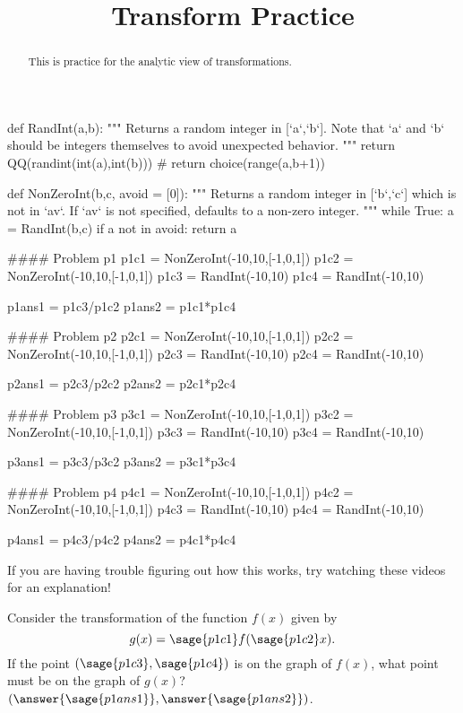 \documentclass{ximera}
\title{Transform Practice}
\begin{document}
\begin{abstract}
    This is practice for the analytic view of transformations.
\end{abstract}
\maketitle

\begin{sagesilent}
def RandInt(a,b):
    """ Returns a random integer in [`a`,`b`]. Note that `a` and `b` should be integers themselves to avoid unexpected behavior.
    """
    return QQ(randint(int(a),int(b)))
    # return choice(range(a,b+1))

def NonZeroInt(b,c, avoid = [0]):
    """ Returns a random integer in [`b`,`c`] which is not in `av`. 
        If `av` is not specified, defaults to a non-zero integer.
    """
    while True:
        a = RandInt(b,c)
        if a not in avoid:
            return a


#### Problem p1
p1c1 = NonZeroInt(-10,10,[-1,0,1])
p1c2 = NonZeroInt(-10,10,[-1,0,1])
p1c3 = RandInt(-10,10)
p1c4 = RandInt(-10,10)

p1ans1 = p1c3/p1c2
p1ans2 = p1c1*p1c4


#### Problem p2
p2c1 = NonZeroInt(-10,10,[-1,0,1])
p2c2 = NonZeroInt(-10,10,[-1,0,1])
p2c3 = RandInt(-10,10)
p2c4 = RandInt(-10,10)

p2ans1 = p2c3/p2c2
p2ans2 = p2c1*p2c4


#### Problem p3
p3c1 = NonZeroInt(-10,10,[-1,0,1])
p3c2 = NonZeroInt(-10,10,[-1,0,1])
p3c3 = RandInt(-10,10)
p3c4 = RandInt(-10,10)

p3ans1 = p3c3/p3c2
p3ans2 = p3c1*p3c4


#### Problem p4
p4c1 = NonZeroInt(-10,10,[-1,0,1])
p4c2 = NonZeroInt(-10,10,[-1,0,1])
p4c3 = RandInt(-10,10)
p4c4 = RandInt(-10,10)

p4ans1 = p4c3/p4c2
p4ans2 = p4c1*p4c4





\end{sagesilent}

If you are having trouble figuring out how this works, try watching these videos for an explanation!



\begin{problem}
    Consider the transformation of the function $f(x)$ given by 
    \[
        g(x) = \sage{p1c1}f( \sage{p1c2}x ).
    \] 
    If the point $(\sage{p1c3}, \sage{p1c4})$ is on the graph of $f(x)$, what point must be on the graph of $g(x)$? $(\answer{\sage{p1ans1}},\answer{\sage{p1ans2}})$.
\end{problem}
\end{document}
